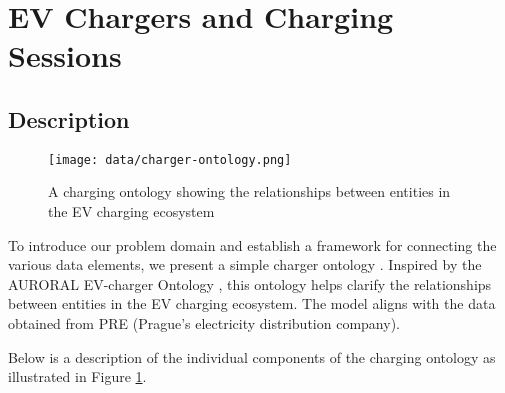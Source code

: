 \section{EV Chargers and Charging Sessions}

\subsection{Description}

\begin{figure}
    \texttt{[image: data/charger-ontology.png]}
    \caption{A charging ontology showing the relationships between entities in the EV charging ecosystem}
    \label{fig:charging-ontology}
\end{figure}


To introduce our problem domain and establish a framework for connecting the various data elements, we present a simple charger ontology . Inspired by the AURORAL EV-charger Ontology , this ontology helps clarify the relationships between entities in the EV charging ecosystem. The model aligns with the data obtained from PRE (Prague's electricity distribution company).

Below is a description of the individual components of the charging ontology as illustrated in Figure \ref{fig:charging-ontology}.

